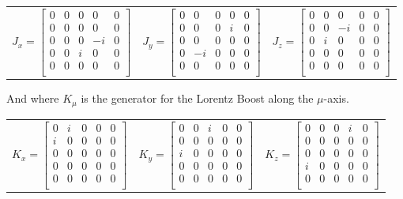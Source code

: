 \documentclass[compress,aspectratio=169,10pt,usenames,dvipsnames]{beamer}
\begin{document}
\begin{frame}
\vfill
\begin{center}
\begin{tabular}{ccc}
	$J_x = \begin{bmatrix}
				0 & 0 & 0 & 0 & 0 \\
				0 & 0 & 0 & 0 & 0\\
				0 & 0 & 0 & -i & 0\\
				0 & 0 & i & 0 & 0\\
				0 & 0 & 0 & 0 & 0\\
			\end{bmatrix}$ &
	$J_y = \begin{bmatrix}
				0 & 0 & 0 & 0 & 0 \\
				0 & 0 & 0 & i & 0\\
				0 & 0 & 0 & 0 & 0\\
				0 & -i & 0 & 0 & 0\\
				0 & 0 & 0 & 0 & 0\\
			\end{bmatrix}$ &
	$J_z = \begin{bmatrix}
				0 & 0 & 0 & 0 & 0 \\
				0 & 0 & -i & 0 & 0\\
				0 & i & 0 & 0 & 0\\
				0 & 0 & 0 & 0 & 0\\
				0 & 0 & 0 & 0 & 0\\
			\end{bmatrix}$ 
\end{tabular}
\end{center}
\vfill
And where $K_\mu$ is the generator for the Lorentz Boost along the $\mu$-axis.
\begin{center}
\begin{tabular}{ccc}
	$K_x = \begin{bmatrix}
				0 & i & 0 & 0 & 0 \\
				i & 0 & 0 & 0 & 0\\
				0 & 0 & 0 & 0 & 0\\
				0 & 0 & 0 & 0 & 0\\
				0 & 0 & 0 & 0 & 0\\
			\end{bmatrix}$ &
	$K_y = \begin{bmatrix}
				0 & 0 & i & 0 & 0 \\
				0 & 0 & 0 & 0 & 0\\
				i & 0 & 0 & 0 & 0\\
				0 & 0 & 0 & 0 & 0\\
				0 & 0 & 0 & 0 & 0\\
			\end{bmatrix}$ &
	$K_z = \begin{bmatrix}
				0 & 0 & 0 & i & 0 \\
				0 & 0 & 0 & 0 & 0\\
				0 & 0 & 0 & 0 & 0\\
				i & 0 & 0 & 0 & 0\\
				0 & 0 & 0 & 0 & 0\\
			\end{bmatrix}$ 
\end{tabular}
\end{center}
\vfill
\end{frame}
\end{document}
